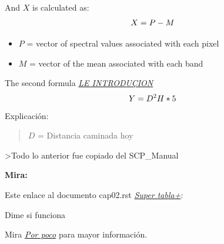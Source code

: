 \documentclass[letterpaper,10pt,french]{sphinxmanual}
\begin{document}
And \(X\) is calculated as:
\begin{gather}
\begin{split}X = P - M\end{split}\notag
\end{gather}\begin{itemize}
\item {} 
\(P\) = vector of spectral values associated with each pixel

\item {} 
\(M\) = vector of the mean associated with each band

\end{itemize}

The second formula {\hyperref[cap01:introduccionr]{\emph{LE INTRODUÇION}}}
\begin{gather}
\begin{split}Y = D^2 H*5\end{split}\notag
\end{gather}
Explicación:
\begin{quote}

\(D\) = Distancia caminada hoy
\end{quote}

\textgreater{}Todo lo anterior fue copiado del SCP\_Manual

\textbf{Mira:}

Este enlace al documento cap02.rst {\hyperref[cap02:sueldo]{\emph{Super tabla+}}}:

Dime si funciona

Mira {\hyperref[cap01:elsuelo]{\emph{Por poco}}} para mayor información.



\renewcommand{\indexname}{Index}
\printindex
\end{document}
